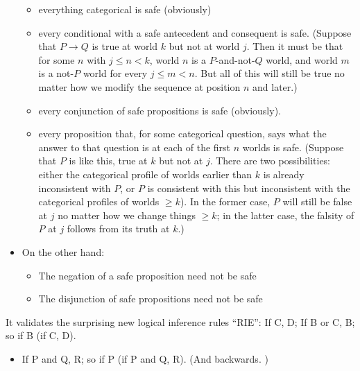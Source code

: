 \documentclass[leqno, 11pt, a5paper, openany]{article}
\begin{document}
\begin{prop}
\begin{itemize}
    \begin{itemize}
        \item
      everything categorical is safe (obviously)
    \item
      every conditional with a safe antecedent and consequent is safe.
      (Suppose that $P→Q$ is true at world $k$ but not at world
      $j$. Then it must be that for some $n$ with $j≤n<k$, world
      $n$ is a $P$-and-not-$Q$ world, and world $m$ is a
      not-$P$ world for every $j≤m<n$. But all of this will still be
      true no matter how we modify the sequence at position $n$ and
      later.)
    \item
      every conjunction of safe propositions is safe (obviously).
    \item
      every proposition that, for some categorical question, says what
      the answer to that question is at each of the first $n$ worlds
      is safe. (Suppose that $P$ is like this, true at $k$ but not
      at $j$. There are two possibilities: either the categorical
      profile of worlds earlier than $k$ is already inconsistent with
      $P$, or $P$ is consistent with this but inconsistent with the
      categorical profiles of worlds $≥k$). In the former case, $P$
      will still be false at $j$ no matter how we change things
      $≥k$; in the latter case, the falsity of $P$ at $j$ follows
      from its truth at $k$.)
    \end{itemize}
  \item
    On the other hand:

    \begin{itemize}
        \item
      The negation of a safe proposition need not be safe
    \item
      The disjunction of safe propositions need not be safe
    \end{itemize}
  \end{itemize}
\item
  It validates the surprising new logical inference rules “RIE”: If C,
  D; If B or C, B; so if B (if C, D).\\
\end{prop}

\begin{itemize}
\item
  If P and Q, R; so if P (if P and Q, R). (And backwards. )
\end{itemize}
\end{document}
